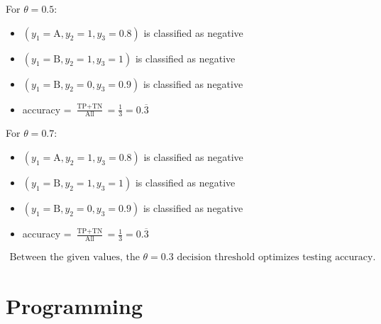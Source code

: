 \documentclass[12pt,a4paper]{article}
\begin{document}
\begin{enumerate}
	      \vspace{20px}

	      For $\theta = 0.5$:
	      \begin{itemize}[label={}]
		      \item	$(y_1=\text{A}, y_2=1, y_3=0.8)$ is classified as negative
		      \item	$(y_1=\text{B}, y_2=1, y_3=1)$ is classified as negative
		      \item	$(y_1=\text{B}, y_2=0, y_3=0.9)$ is classified as negative
		      \item accuracy = $\frac{\text{TP} + \text{TN}}{\text{All}} = \frac{1}{3} = 0.\overline{3}$
	      \end{itemize}

	      \vspace{20px}

	      For $\theta = 0.7$:
	      \begin{itemize}[label={}]
		      \item $(y_1=\text{A}, y_2=1, y_3=0.8)$ is classified as negative
		      \item $(y_1=\text{B}, y_2=1, y_3=1)$ is classified as negative
		      \item $(y_1=\text{B}, y_2=0, y_3=0.9)$ is classified as negative
		      \item accuracy = $\frac{\text{TP} + \text{TN}}{\text{All}} = \frac{1}{3} = 0.\overline{3}$
	      \end{itemize}

	      \vspace{20px}

	      \begin{gather*}
		      \text{Between the given values, the }\theta = 0.3 \text{ decision threshold optimizes testing accuracy.}
	      \end{gather*}

	      \pagebreak

\end{enumerate}

\section{Programming}
\end{document}
